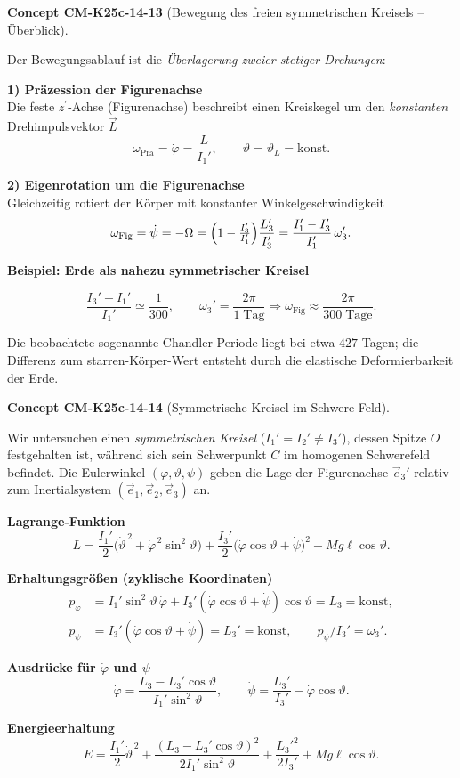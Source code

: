 \documentclass[10pt, letterpaper]{article}
\newcommand{\CustomHeading}[3]{%
  \par\medskip\noindent%
  \textbf{#1 #2} \textnormal{(#3)}.\enskip%
}
\newenvironment{CONC}[2]{\CustomHeading{Concept}{#1}{#2}}{}
\begin{document}
\begin{CONC}{CM-K25c-14-13}{Bewegung des freien symmetrischen Kreisels – Überblick}
Der Bewegungsablauf ist die \emph{Überlagerung zweier stetiger Drehungen}:

\textbf{1) Präzession der Figurenachse}\\
Die feste $z^{\prime}$-Achse (Figurenachse) beschreibt einen Kreiskegel um den \emph{konstanten} Drehimpuls­vektor $\vec L$  
\[
\omega_{\text{Prä}}=\dot{\varphi}= \frac{L}{I_1'},
\qquad
\vartheta=\vartheta_L=\text{konst}.
\]

\textbf{2) Eigenrotation um die Figurenachse}\\
Gleichzeitig rotiert der Körper mit konstanter Winkelgeschwindigkeit  
\[
\omega_{\text{Fig}}=\dot{\psi}
          =-\Omega
          =\Bigl(1-\tfrac{I_3'}{I_1'}\Bigr)\frac{L_3'}{I_3'}
          =\frac{I_1'-I_3'}{I_1'}\,\omega_3'.
\]

\bigskip
\textbf{Beispiel: Erde als nahezu symmetrischer Kreisel}

\[
\frac{I_3'-I_1'}{I_1'}\simeq\frac{1}{300},
\qquad
\omega_3'=\frac{2\pi}{1\;\text{Tag}}
\Longrightarrow
\omega_{\text{Fig}}\approx\frac{2\pi}{300\;\text{Tage}}.
\]

Die beobachtete sogenannte Chandler-Periode liegt bei etwa $427$ Tagen; die Differenz zum starren-Körper-Wert entsteht durch die elastische Deformierbarkeit der Erde.
\end{CONC}

\begin{CONC}{CM-K25c-14-14}{Symmetrische Kreisel im Schwere-Feld}
Wir untersuchen einen \emph{symmetrischen Kreisel} ($I_1'=I_2'\neq I_3'$), dessen Spitze $O$ festgehalten ist, während sich sein Schwerpunkt $C$ im homogenen Schwerefeld befindet. Die Euler­winkel $(\varphi,\vartheta,\psi)$ geben die Lage der Figurenachse $\vec e_3'$ relativ zum Inertialsystem $(\vec e_1,\vec e_2,\vec e_3)$ an.  

\textbf{Lagrange-Funktion}\\
\[
L = \frac{I_1'}{2}\bigl(\dot\vartheta^{\,2}+\dot\varphi^{\,2}\sin^{2}\vartheta\bigr)
    +\frac{I_3'}{2}\bigl(\dot\varphi\cos\vartheta+\dot\psi\bigr)^{2}
    -Mg\ell\cos\vartheta .
\]

\textbf{Erhaltungsgrößen (zyklische Koordinaten)}  
\[
\begin{aligned}
p_\varphi &= I_1'\sin^{2}\vartheta\,\dot\varphi
           +I_3'(\dot\varphi\cos\vartheta+\dot\psi)\cos\vartheta
           =L_3=\text{konst},\\[4pt]
p_\psi    &= I_3'(\dot\varphi\cos\vartheta+\dot\psi)
           =L_3'=\text{konst},\qquad
p_\psi/I_3'=\omega_3'.
\end{aligned}
\]

\textbf{Ausdrücke für $\dot\varphi$ und $\dot\psi$}  
\[
\dot\varphi = \frac{L_3-L_3'\cos\vartheta}{I_1'\sin^{2}\vartheta},
\qquad
\dot\psi    = \frac{L_3'}{I_3'}
             -\dot\varphi\cos\vartheta .
\]

\textbf{Energieerhaltung}\\
\[
E = \frac{I_1'}{2}\dot\vartheta^{\,2}
    +\frac{(L_3-L_3'\cos\vartheta)^{2}}{2I_1'\sin^{2}\vartheta}
    +\frac{L_3'^{2}}{2I_3'}
    +Mg\ell\cos\vartheta .
\tag{3}
\]
\end{CONC}
\end{document}
